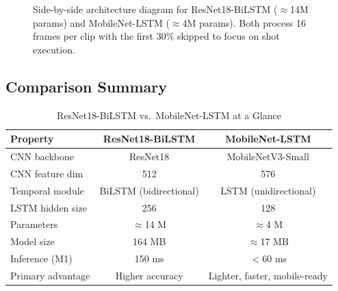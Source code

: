 \documentclass[11pt,a4paper]{article}
\begin{document}
\begin{figure}[H]
\caption{Side-by-side architecture diagram for ResNet18-BiLSTM ($\approx$14M params) and MobileNet-LSTM ($\approx$4M params). Both process 16 frames per clip with the first 30\% skipped to focus on shot execution.}
\label{fig:arch_diagram}
\end{figure}

\subsection{Comparison Summary}

\begin{table}[H]
\centering
\caption{ResNet18-BiLSTM vs.\ MobileNet-LSTM at a Glance}
\begin{tabular}{lcc}
\toprule
\textbf{Property} & \textbf{ResNet18-BiLSTM} & \textbf{MobileNet-LSTM} \\
\midrule
CNN backbone & ResNet18 & MobileNetV3-Small \\
CNN feature dim & 512 & 576 \\
Temporal module & BiLSTM (bidirectional) & LSTM (unidirectional) \\
LSTM hidden size & 256 & 128 \\
Parameters & $\approx$14 M & $\approx$4 M \\
Model size & 164 MB & $\approx$17 MB \\
Inference (M1) & 150 ms & $<$60 ms \\
Primary advantage & Higher accuracy & Lighter, faster, mobile-ready \\
\bottomrule
\end{tabular}
\end{table}
\end{document}

